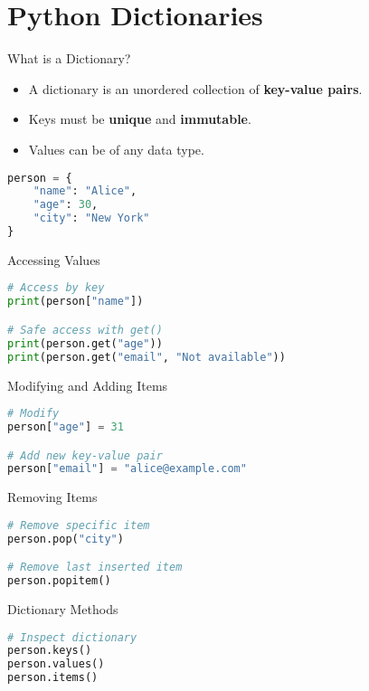\section{Python Dictionaries}

\begin{frame}[plain]
\sectionpage
\end{frame}

\begin{frame}[fragile]{What is a Dictionary?}
\begin{itemize}
    \item A dictionary is an unordered collection of \textbf{key-value pairs}.
    \item Keys must be \textbf{unique} and \textbf{immutable}.
    \item Values can be of any data type.
\end{itemize}
\begin{lstlisting}[language=Python]
person = {
    "name": "Alice",
    "age": 30,
    "city": "New York"
}
\end{lstlisting}
\end{frame}

\begin{frame}[fragile]{Accessing Values}
\begin{lstlisting}[language=Python]
# Access by key
print(person["name"])

# Safe access with get()
print(person.get("age"))
print(person.get("email", "Not available"))
\end{lstlisting}
\end{frame}

\begin{frame}[fragile]{Modifying and Adding Items}
\begin{lstlisting}[language=Python]
# Modify
person["age"] = 31

# Add new key-value pair
person["email"] = "alice@example.com"
\end{lstlisting}
\end{frame}

\begin{frame}[fragile]{Removing Items}
\begin{lstlisting}[language=Python]
# Remove specific item
person.pop("city")

# Remove last inserted item
person.popitem()
\end{lstlisting}
\end{frame}

\begin{frame}[fragile]{Dictionary Methods}
\begin{lstlisting}[language=Python]
# Inspect dictionary
person.keys()
person.values()
person.items()
\end{lstlisting}
\end{frame}

